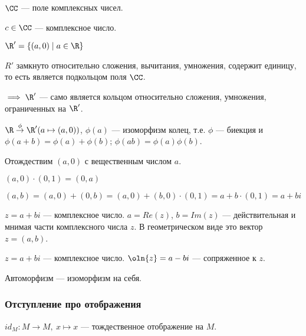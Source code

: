 \begin{defn}
    $\CC$ --- поле комплексных чисел.
\end{defn}

\begin{defn}
    $c \in \CC$ --- комплексное число.
\end{defn}

\begin{theorem-non}
    
    $\R' = \{(a, 0) \mid a \in \R\}$
    
    $R'$ замкнуто относительно сложения, вычитания, умножения, содержит единицу, то есть является подкольцом поля $\CC$.
    
    $\implies \R'$ --- само является кольцом относительно сложения, умножения, ограниченных на $\R'$. 
    
    $\R \overset{\phi}{\to} \R'(a \mapsto (a, 0))$, $\phi(a)$ --- изоморфизм колец, т.е. $\phi$ --- биекция и $\phi(a + b) = \phi(a) + \phi(b)$; $\phi(ab) = \phi(a)\phi(b)$.
    
    Отождествим $(a, 0)$ с вещественным числом $a$.
    
    $(a, 0) \cdot (0, 1) = (0, a)$
    
    $(a, b) = (a, 0) + (0, b) = (a, 0) + (b, 0) \cdot (0, 1) = a + b \cdot (0, 1) = a + bi$
\end{theorem-non}

\begin{defn}
    $z = a + bi$ --- комплексное число.
    $a = Re(z)$, $b = Im(z)$ --- действительная и мнимая части комплексного числа $z$.
    В геометрическом виде это вектор $z = (a, b)$.
\end{defn}

\begin{defn}
    $z = a + bi$ --- комплексное число. 
    $\oln{z} = a - bi$ --- сопряженное к $z$.
\end{defn}

\begin{defn}
    Автоморфизм --- изоморфизм на себя.
\end{defn}

\subsubsection*{Отступление про отображения}

\begin{defn}
    $id_M: M \to M,~x \mapsto x$ --- тождественное отображение на $M$.
\end{defn}

